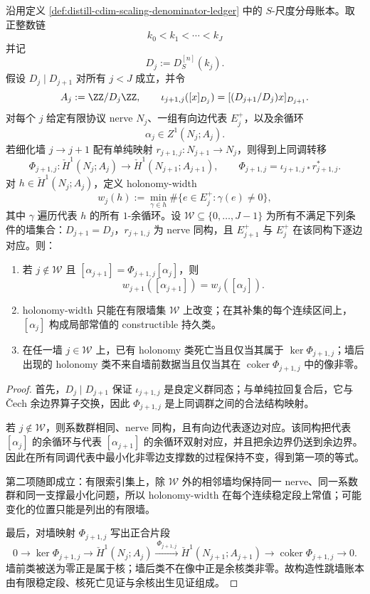 \begin{theorem}\label{thm:distill-cdim-constructible-holonomy-width-jump-ledger}
沿用定义 \ref{def:distill-cdim-scaling-denominator-ledger} 中的 \(S\)-尺度分母账本。取正整数链
\[
k_0<k_1<\cdots<k_J
\]
并记
\[
D_j:=D^{[n]}_S(k_j).
\]
假设 \(D_j\mid D_{j+1}\) 对所有 \(j<J\) 成立，并令
\[
A_j:=\ZZ/D_j\ZZ,
\qquad
\iota_{j+1,j}([x]_{D_j})=[(D_{j+1}/D_j)x]_{D_{j+1}}.
\]
对每个 \(j\) 给定有限协议 nerve \(N_j\)、一组有向边代表 \(E_j^+\)，以及余循环
\[
\alpha_j\in Z^1(N_j;A_j).
\]
若细化墙 \(j\to j+1\) 配有单纯映射 \(r_{j+1,j}:N_{j+1}\to N_j\)，则得到上同调转移
\[
\Phi_{j+1,j}:\check H^1(N_j;A_j)\longrightarrow \check H^1(N_{j+1};A_{j+1}),
\qquad
\Phi_{j+1,j}=\iota_{j+1,j\,*}r_{j+1,j}^{\ast}.
\]
对 \(h\in\check H^1(N_j;A_j)\)，定义 holonomy-width
\[
w_j(h):=\min_{\gamma\in h}\#\{e\in E_j^+:\gamma(e)\ne0\},
\]
其中 \(\gamma\) 遍历代表 \(h\) 的所有 \(1\)-余循环。设 \(\mathcal W\subseteq\{0,\ldots,J-1\}\) 为所有不满足下列条件的墙集合：\(D_{j+1}=D_j\)，\(r_{j+1,j}\) 为 nerve 同构，且 \(E_{j+1}^+\) 与 \(E_j^+\) 在该同构下逐边对应。则：
\begin{enumerate}
  \item 若 \(j\notin\mathcal W\) 且 \([\alpha_{j+1}]=\Phi_{j+1,j}[\alpha_j]\)，则
  \[
  w_{j+1}([\alpha_{j+1}])=w_j([\alpha_j]).
  \]
  \item holonomy-width 只能在有限墙集 \(\mathcal W\) 上改变；在其补集的每个连续区间上，\([\alpha_j]\) 构成局部常值的 constructible 持久类。
  \item 在任一墙 \(j\in\mathcal W\) 上，已有 holonomy 类死亡当且仅当其属于 \(\ker\Phi_{j+1,j}\)；墙后出现的 holonomy 类不来自墙前数据当且仅当其在 \(\operatorname{coker}\Phi_{j+1,j}\) 中的像非零。
\end{enumerate}
\end{theorem}
\begin{proof}
首先，\(D_j\mid D_{j+1}\) 保证 \(\iota_{j+1,j}\) 是良定义群同态；与单纯拉回复合后，它与 \v Cech 余边界算子交换，因此 \(\Phi_{j+1,j}\) 是上同调群之间的合法结构映射。

若 \(j\notin\mathcal W\)，则系数群相同、nerve 同构，且有向边代表逐边对应。该同构把代表 \([\alpha_j]\) 的余循环与代表 \([\alpha_{j+1}]\) 的余循环双射对应，并且把余边界仍送到余边界。因此在所有同调代表中最小化非零边支撑数的过程保持不变，得到第一项的等式。

第二项随即成立：有限索引集上，除 \(\mathcal W\) 外的相邻墙均保持同一 nerve、同一系数群和同一支撑最小化问题，所以 holonomy-width 在每个连续稳定段上常值；可能变化的位置只能是列出的有限墙。

最后，对墙映射 \(\Phi_{j+1,j}\) 写出正合片段
\[
0\longrightarrow\ker\Phi_{j+1,j}\longrightarrow \check H^1(N_j;A_j)
\xrightarrow{\ \Phi_{j+1,j}\ }
\check H^1(N_{j+1};A_{j+1})
\longrightarrow\operatorname{coker}\Phi_{j+1,j}\longrightarrow0 .
\]
墙前类被送为零正是属于核；墙后类不在像中正是余核类非零。故构造性跳墙账本由有限稳定段、核死亡见证与余核出生见证组成。
\end{proof}
